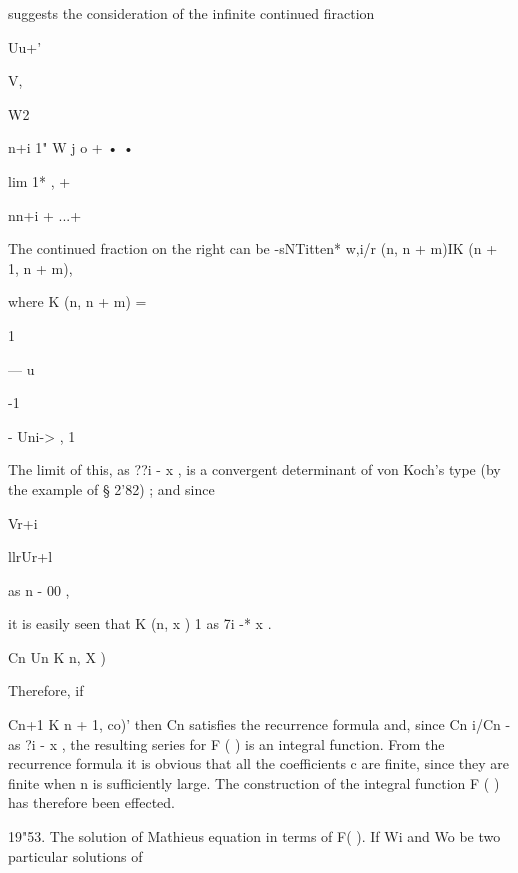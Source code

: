 suggests the consideration of the infinite continued firaction 



Uu+'  



V, 



W2 



n+i 1" W j o + • • 



lim 1* , +   



nn+i + ...+ 






The continued fraction on the right can be -sNTitten* 
w,i/r (n, n + m)IK (n + 1, n + m), 



where K (n, n + m) = 



1 

— u 





-1 



- Uni-> , 1 



The limit of this, as ??i -  x , is a convergent determinant of von Koch's 
type (by the example of § 2'82) ; and since 

Vr+i 



llrUr+l 



as n  - 00 , 



it is easily seen that K (n, x )   1 as 7i -* x . 

Cn Un K  n, X ) 



Therefore, if 



Cn+1 K n + 1, co)' 
then Cn satisfies the recurrence formula and, since Cn i/Cn  - as ?i  - x , the 
resulting series for F ( ) is an integral function. From the recurrence formula 
it is obvious that all the coefficients c  are finite, since they are finite when n 
is sufficiently large. The construction of the integral function F ( ) has 
therefore been effected. 

19"53. The solution of Mathieus equation in terms of F( ). 
If Wi and Wo be two particular solutions of 



